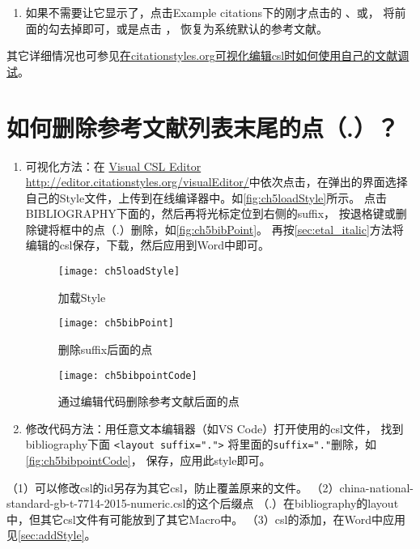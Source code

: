 \documentclass[theorem=false,mathfont=none,openany,sub3section]{easybook}
\begin{document}
{\begin{enumerate}
	\item 如果不需要让它显示了，点击Example citations下的刚才点击的
	、或，
	将前面的勾去掉即可，或是点击 ，
	恢复为系统默认的参考文献。
\end{enumerate}
其它详细情况也可参见\href{https://zhuanlan.zhihu.com/p/437380542}
{在citationstyles.org可视化编辑csl时如何使用自己的文献调试}。

\section{如何删除参考文献列表末尾的点（.）？}\label{sec:bibPoint}	

\begin{enumerate}
	\item 可视化方法：在
	\href{http://editor.citationstyles.org/visualEditor/}{Visual CSL Editor} 
	\url{http://editor.citationstyles.org/visualEditor/}中依次点击，在弹出的界面选择自己的Style文件，上传到在线编译器中。如\autoref{fig:ch5loadStyle}所示。
	点击BIBLIOGRAPHY下面的，然后再将光标定位到右侧的suffix，
	按退格键或删除键将框中的点（.）删除，如\autoref{fig:ch5bibPoint}。
	再按\cref{sec:etal_italic}方法将编辑的csl保存，下载，然后应用到Word中即可。
	\begin{figure}[htbp]
		\centering
		\texttt{[image: ch5loadStyle]}
		\caption{加载Style}
		\label{fig:ch5loadStyle}
	\end{figure}
	
	\begin{figure}[htbp]
		\centering
		\texttt{[image: ch5bibPoint]}
		\caption{删除suffix后面的点}
		\label{fig:ch5bibPoint}
	\end{figure}
	\begin{figure}[htbp]
		\centering
		\texttt{[image: ch5bibpointCode]}
		\caption{通过编辑代码删除参考文献后面的点}
		\label{fig:ch5bibpointCode}
	\end{figure}			
	
	\item 修改代码方法：用任意文本编辑器（如VS Code）打开使用的csl文件，
	找到bibliography下面 
	\verb|<layout suffix=".">|	
	将里面的\verb|suffix="."|删除，如\autoref{fig:ch5bibpointCode}，
	保存，应用此style即可。
	
	
\end{enumerate}
\begin{note}
	（1）可以修改csl的id另存为其它csl，防止覆盖原来的文件。
	（2）china-national-standard-gb-t-7714-2015-numeric.csl的这个后缀点
	（.）在bibliography的layout中，但其它csl文件有可能放到了其它Macro中。
	（3）csl的添加，在Word中应用见\cref{sec:addStyle}。
\end{note}

}
\end{document}
